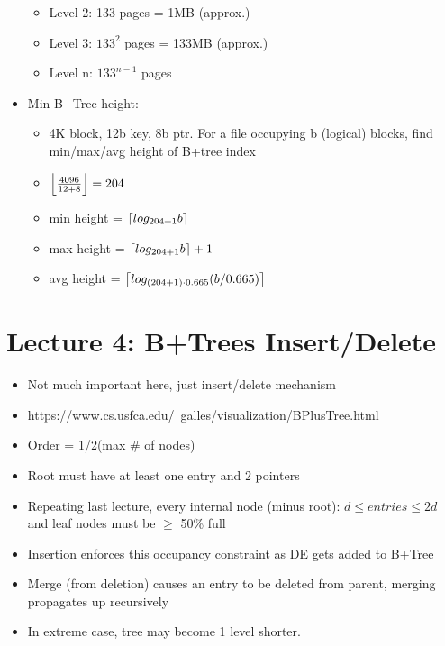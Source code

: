 \documentclass{article}
\DeclarePairedDelimiter\ceil{\lceil}{\rceil}
\DeclarePairedDelimiter\floor{\lfloor}{\rfloor}
\begin{document}
\begin{itemize}
\begin{itemize}
            \item Level 2: 133 pages = 1MB (approx.)
            \item Level 3: $133^2$ pages = 133MB (approx.)
            \item Level n: $\displaystyle{133^{n-1}}$ pages
        \end{itemize}
    \item Min B+Tree height:
        \begin{itemize}
            \item 4K block, 12b key, 8b ptr. For a file occupying b (logical) blocks, find min/max/avg height of B+tree index
            \item $\floor*{\frac{4096}{12+8}} = 204$
            \item min height = $\ceil*{log_{204+1}b}$
            \item max height = $\ceil*{log_{204+1}b} + 1$
            \item avg height = $\displaystyle{\ceil*{log_{(204 + 1)\cdot 0.665}(b/0.665)}}$
        \end{itemize}
\end{itemize}

\section{Lecture 4: B+Trees Insert/Delete}
\begin{itemize}
    \item Not much important here, just insert/delete mechanism
    \item https://www.cs.usfca.edu/~galles/visualization/BPlusTree.html
    \item Order = 1/2(max \# of nodes)
    \item Root must have at least one entry and 2 pointers
    \item Repeating last lecture, every internal node (minus root): $d \leq entries \leq 2d$ and leaf nodes must be $\geq$ 50\% full
    \item Insertion enforces this occupancy constraint as DE gets added to B+Tree
    \item Merge (from deletion) causes an entry to be deleted from parent, merging propagates up recursively
    \item In extreme case, tree may become 1 level shorter.
\end{itemize}
\end{document}
